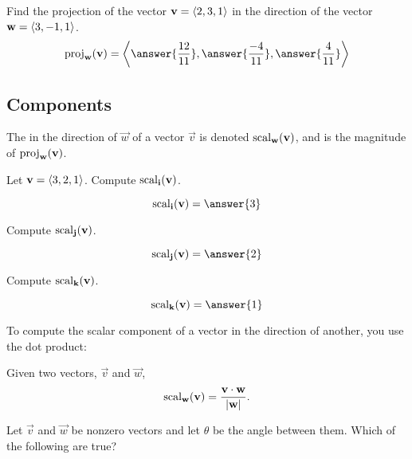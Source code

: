 \documentclass{ximera}
\begin{document}
\begin{question}
  Find the projection of the vector $\mathbf{v} = \left\langle 2,3,1\right\rangle$ in the
  direction of the vector $\mathbf{w} = \left\langle 3,-1,1\right\rangle$.
  \[
  \proj_\vec{w}(\vec{v}) = \vector{\answer{\frac{12}{11}},\answer{\frac{-4}{11}},\answer{\frac{4}{11}}}
  \]
\end{question}

\subsection{Components}

\begin{definition}
  The  in the direction of
  $\vec{w}$ of a vector $\vec{v}$ is denoted $\operatorname{scal}_\mathbf{w}(\mathbf{v})$,
  and is the magnitude of $\operatorname{proj}_\mathbf{w}(\mathbf{v})$.
\end{definition}

\begin{question}
  Let $\mathbf{v} = \left\langle 3,2,1\right\rangle$. Compute $\operatorname{scal}_{\mathbf{i}}(\mathbf{v})$.
  \begin{prompt}
    \[
    \scal_\veci(\vec{v}) = \answer{3}
    \]
  \end{prompt}
  \begin{question}
    Compute $\operatorname{scal}_{\mathbf{j}}(\mathbf{v})$.
    \begin{prompt}
      \[
      \scal_\vecj(\vec{v}) = \answer{2}
      \]
    \end{prompt}
    \begin{question}
      Compute $\operatorname{scal}_{\mathbf{k}}(\mathbf{v})$.
      \begin{prompt}
        \[
        \scal_\veck(\vec{v}) = \answer{1}
        \]
      \end{prompt}
    \end{question}
  \end{question}
\end{question}
To compute the scalar component of a vector in the direction of
another, you use the dot product:

\begin{theorem}
  Given two vectors, $\vec{v}$ and $\vec{w}$,
  \[
  \operatorname{scal}_\mathbf{w}(\mathbf{v}) =\frac{\mathbf{v} \cdot \mathbf{w}}{|\mathbf{w}|}.
  \]
\end{theorem}

\begin{question}
  Let $\vec{v}$ and $\vec{w}$ be nonzero vectors and let $\theta$ be
  the angle between them. Which of the following are true?
  \begin{selectAll}
  \end{selectAll}
\end{question}
\end{document}
